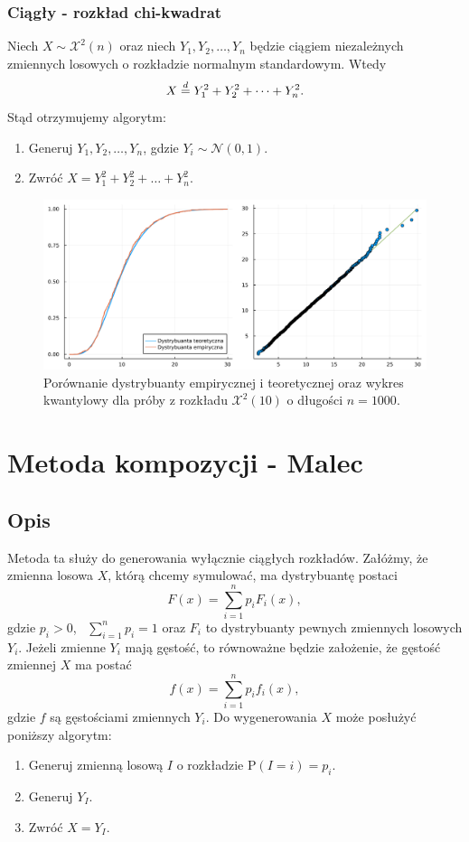 \documentclass[12pt]{mwrep}
\begin{document}
	\subsubsection{Ciągły - rozkład chi-kwadrat}
	\noindent Niech $ X \sim \mathcal{X}^2(n) $ oraz niech $Y_1, Y_2, \dots, Y_n$ będzie ciągiem niezależnych zmiennych losowych o rozkładzie normalnym standardowym. Wtedy
	$$ X \buildrel{d} \over{=} Y_1^2 + Y_2^2 + \dots + Y_n^2. $$
	Stąd otrzymujemy algorytm:
	\begin{enumerate}[leftmargin=10mm]
		\item Generuj $ Y_1, Y_2, \dots, Y_n $, gdzie $Y_i \sim \mathcal{N}(0, 1) $.
		\item Zwróć $ X = Y_1^2 + Y_2^2 + \dots + Y_n^2 $.
	\end{enumerate}
	\begin{figure}[H]
		\centering
		\caption{Porównanie dystrybuanty empirycznej i teoretycznej oraz wykres kwantylowy dla próby z rozkładu $\mathcal{X}^2(10)$ o długości $n = 1000$.}
		\includegraphics[scale=0.1]{fig/fig_splot2.png}
	\end{figure}
	
	
	
	
	
	\section{Metoda kompozycji - Malec}
	
	\subsection{Opis}
	\noindent Metoda ta służy do generowania wyłącznie ciągłych rozkładów. Załóżmy, że zmienna losowa $X$, którą chcemy symulować, ma dystrybuantę postaci
	$$ F(x) = \sum_{i=1}^n p_i F_i(x), $$
	gdzie $p_i > 0$, \ $\sum\limits_{i=1}^n p_i = 1$ oraz $F_i$ to dystrybuanty pewnych zmiennych losowych $Y_i$. Jeżeli zmienne $Y_i$ mają gęstość, to równoważne będzie założenie, że gęstość zmiennej $X$ ma postać
	$$ f(x) = \sum_{i=1}^n p_i f_i(x), $$
	gdzie $f$ są gęstościami zmiennych $Y_i$. Do wygenerowania $X$ może posłużyć poniższy algorytm:
	\begin{enumerate}[leftmargin=10mm]
		\item Generuj zmienną losową $I$ o rozkładzie $\mathrm{P}(I = i) = p_i$.
		\item Generuj $Y_I$.
		\item Zwróć $X = Y_I$.
	\end{enumerate}
\end{document}
